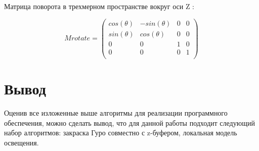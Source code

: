 Матрица поворота в трехмерном пространстве вокруг оси Z :

\begin{equation}
	Mrotate = \left(
	\begin{array}{cccc}
			cos(\theta) & -sin(\theta) & 0 & 0 \\
			sin(\theta) & cos(\theta)  & 0 & 0 \\
			0           & 0            & 1 & 0 \\
			0           & 0            & 0 & 1 \\
		\end{array}
	\right)
\end{equation}

\newpage

\section {Вывод}

Оценив все изложенные выше алгоритмы для реализации программного обеспечения, можно сделать вывод, что для данной работы подходит следующий набор алгоритмов: закраска Гуро совместно с z-буфером, локальная модель освещения. 




